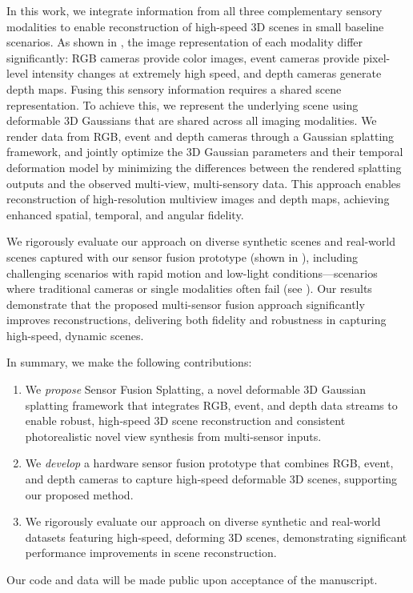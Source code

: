 In this work, we integrate information from all three complementary sensory modalities to enable reconstruction of high-speed 3D scenes in small baseline scenarios.
As shown in \figureautorefname{~\ref{fig:overall}}, the image representation of each modality differ significantly: RGB cameras provide color images, event cameras provide pixel-level intensity changes at extremely high speed, and depth cameras generate depth maps.
Fusing this sensory information requires a shared scene representation.
To achieve this, we represent the underlying scene using deformable 3D Gaussians that are shared across all imaging modalities.
We render data from RGB, event and depth cameras through a Gaussian splatting framework, and jointly optimize the 3D Gaussian parameters and their temporal deformation model by
minimizing the differences between the rendered splatting outputs and the observed multi-view, multi-sensory data.
This approach enables reconstruction of high-resolution multiview images and depth maps, achieving enhanced spatial, temporal, and angular fidelity. 

We rigorously evaluate our approach on diverse synthetic scenes and real-world scenes captured with our sensor fusion prototype (shown in \figureautorefname{~\ref{fig:hardware_setup}}), including challenging scenarios with rapid motion and low-light conditions---scenarios where traditional cameras or single modalities often fail (see \figureautorefname{~\ref{fig:real_world_applications}}). 
Our results demonstrate that the proposed multi-sensor fusion approach significantly improves reconstructions, delivering both fidelity and robustness in capturing high-speed, dynamic scenes.

In summary, we make the following contributions:
\begin{enumerate}
    \item We \textit{propose} Sensor Fusion Splatting, a novel deformable 3D Gaussian splatting framework that integrates RGB, event, and depth data streams to enable robust, high-speed 3D scene reconstruction and consistent photorealistic novel view synthesis from multi-sensor inputs.
    
    \item We \textit{develop} a hardware sensor fusion prototype that combines RGB, event, and depth cameras to capture high-speed deformable 3D scenes, supporting our proposed method. 

    \item We rigorously evaluate our approach on diverse synthetic and real-world datasets featuring high-speed, deforming 3D scenes, demonstrating significant performance improvements in scene reconstruction.
\end{enumerate}
\noindent
Our code and data will be made public upon acceptance of the manuscript.






    

